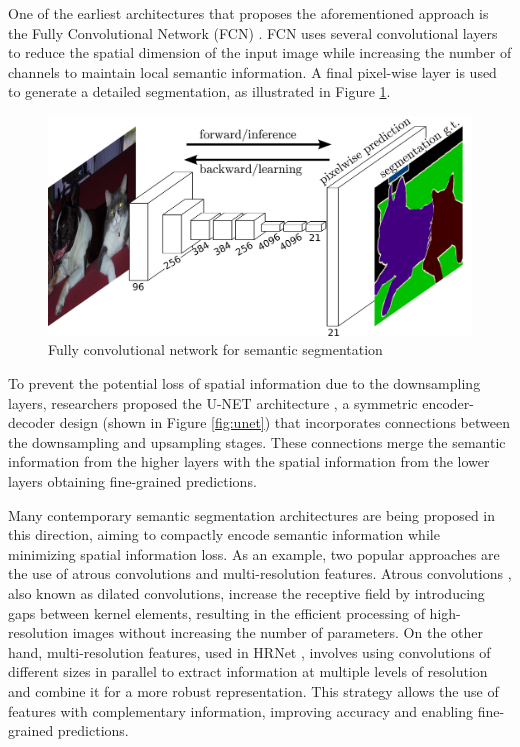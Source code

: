 One of the earliest architectures that proposes the aforementioned approach is the Fully Convolutional Network (FCN) \cite{FCN}. FCN uses several convolutional layers to reduce the spatial dimension of the input image while increasing the number of channels to maintain local semantic information. A final pixel-wise layer is used to generate a detailed segmentation, as illustrated in Figure \ref{fig:fcn}.


\begin{figure}
    \centering
    \includegraphics[width=0.7\columnwidth]{img/2-related-work/design-fcn.jpeg}
    \caption[Fully convolutional network n (FCN)]{Fully convolutional network for semantic segmentation \cite{FCN}}
    \label{fig:fcn}
\end{figure}

To prevent the potential loss of spatial information due to the downsampling layers, researchers proposed the U-NET architecture \cite{UNET}, a symmetric encoder-decoder design (shown in Figure \ref{fig:unet}) that incorporates connections between the downsampling and upsampling stages. These connections merge the semantic information from the higher layers with the spatial information from the lower layers obtaining fine-grained predictions.

Many contemporary semantic segmentation architectures are being proposed in this direction, aiming to compactly encode semantic information while minimizing spatial information loss. As an example, two popular approaches are the use of atrous convolutions and multi-resolution features. 
Atrous convolutions \cite{DeeplabV3}, also known as dilated convolutions, increase the receptive field by introducing gaps between kernel elements, resulting in the efficient processing of high-resolution images without increasing the number of parameters. On the other hand, multi-resolution features, used in HRNet \cite{HRNET}, involves using convolutions of different sizes in parallel to extract information at multiple levels of resolution and combine it for a more robust representation. This strategy allows the use of features with complementary information, improving accuracy and enabling fine-grained predictions. 

